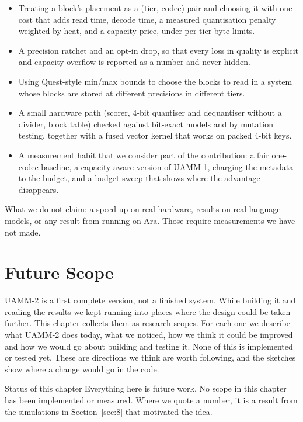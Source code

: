 \documentclass[12pt,a4paper]{report}
\begin{document}
\begin{itemize}
\item Treating a block's placement as a (tier, codec) pair and choosing it with one cost that adds read time, decode time, a measured quantisation penalty weighted by heat, and a capacity price, under per-tier byte limits.
\item A precision ratchet and an opt-in drop, so that every loss in quality is explicit and capacity overflow is reported as a number and never hidden.
\item Using Quest-style min/max bounds to choose the blocks to read in a system whose blocks are stored at different precisions in different tiers.
\item A small hardware path (scorer, 4-bit quantiser and dequantiser without a divider, block table) checked against bit-exact models and by mutation testing, together with a fused vector kernel that works on packed 4-bit keys.
\item A measurement habit that we consider part of the contribution: a fair one-codec baseline, a capacity-aware version of UAMM-1, charging the metadata to the budget, and a budget sweep that shows where the advantage disappears.
\end{itemize}
What we do not claim: a speed-up on real hardware, results on real language models, or any result from running on Ara. Those require measurements we have not made.

\chapter{Future Scope}\label{sec:12}
UAMM-2 is a first complete version, not a finished system. While building it and reading the results we kept running into places where the design could be taken further. This chapter collects them as research scopes. For each one we describe what UAMM-2 does today, what we noticed, how we think it could be improved and how we would go about building and testing it. None of this is implemented or tested yet. These are directions we think are worth following, and the sketches show where a change would go in the code.

\begin{calloutbox}{Status of this chapter}
Everything here is future work. No scope in this chapter has been implemented or measured. Where we quote a number, it is a result from the simulations in Section~\ref{sec:8} that motivated the idea.

\end{calloutbox}
\end{document}
